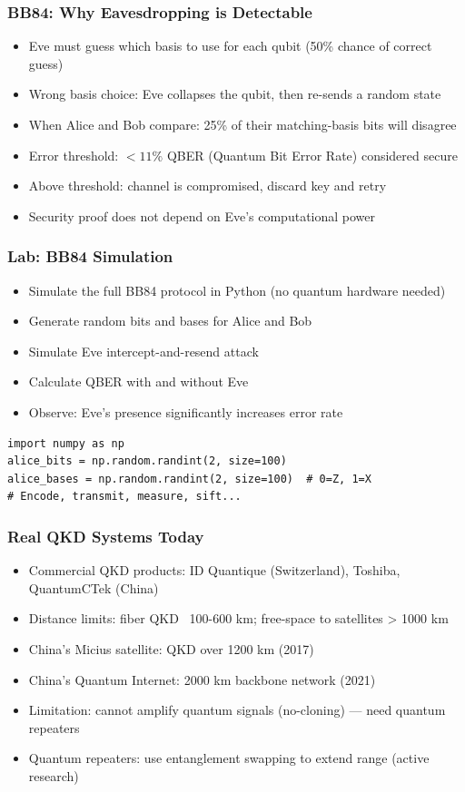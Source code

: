 \begin{frame}[fragile]\frametitle{BB84: Why Eavesdropping is Detectable}
\begin{itemize}
\item Eve must guess which basis to use for each qubit (50\% chance of correct guess)
\item Wrong basis choice: Eve collapses the qubit, then re-sends a random state
\item When Alice and Bob compare: 25\% of their matching-basis bits will disagree
\item Error threshold: $< 11\%$ QBER (Quantum Bit Error Rate) considered secure
\item Above threshold: channel is compromised, discard key and retry
\item Security proof does not depend on Eve's computational power
\end{itemize}
\end{frame}

\begin{frame}[fragile]\frametitle{Lab: BB84 Simulation}
\begin{itemize}
\item Simulate the full BB84 protocol in Python (no quantum hardware needed)
\item Generate random bits and bases for Alice and Bob
\item Simulate Eve intercept-and-resend attack
\item Calculate QBER with and without Eve
\item Observe: Eve's presence significantly increases error rate
\end{itemize}
\begin{verbatim}
import numpy as np
alice_bits = np.random.randint(2, size=100)
alice_bases = np.random.randint(2, size=100)  # 0=Z, 1=X
# Encode, transmit, measure, sift...
\end{verbatim}
\end{frame}

\begin{frame}[fragile]\frametitle{Real QKD Systems Today}
\begin{itemize}
\item Commercial QKD products: ID Quantique (Switzerland), Toshiba, QuantumCTek (China)
\item Distance limits: fiber QKD ~100-600 km; free-space to satellites > 1000 km
\item China's Micius satellite: QKD over 1200 km (2017)
\item China's Quantum Internet: 2000 km backbone network (2021)
\item Limitation: cannot amplify quantum signals (no-cloning) --- need quantum repeaters
\item Quantum repeaters: use entanglement swapping to extend range (active research)
\end{itemize}
\end{frame}

